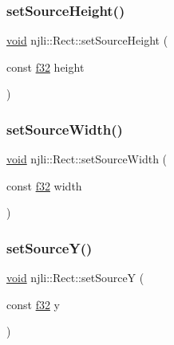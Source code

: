 \mbox{\label{classnjli_1_1_rect_ac47ba4c289d8439dafd653e3c403131a}} 
\subsubsection{\texorpdfstring{set\+Source\+Height()}{setSourceHeight()}}
{\footnotesize\ttfamily \mbox{\hyperlink{_thread_8h_af1e856da2e658414cb2456cb6f7ebc66}{void}} njli\+::\+Rect\+::set\+Source\+Height (\begin{DoxyParamCaption}\item[{const \mbox{\hyperlink{_util_8h_a5f6906312a689f27d70e9d086649d3fd}{f32}}}]{height }\end{DoxyParamCaption})}

\mbox{\label{classnjli_1_1_rect_aa3fd64395ce6b785b3ba5b38d11e1ee8}} 
\subsubsection{\texorpdfstring{set\+Source\+Width()}{setSourceWidth()}}
{\footnotesize\ttfamily \mbox{\hyperlink{_thread_8h_af1e856da2e658414cb2456cb6f7ebc66}{void}} njli\+::\+Rect\+::set\+Source\+Width (\begin{DoxyParamCaption}\item[{const \mbox{\hyperlink{_util_8h_a5f6906312a689f27d70e9d086649d3fd}{f32}}}]{width }\end{DoxyParamCaption})}

\mbox{\label{classnjli_1_1_rect_aad437bb2add0ea5cb17f32a51877e70e}} 
\subsubsection{\texorpdfstring{set\+Source\+Y()}{setSourceY()}}
{\footnotesize\ttfamily \mbox{\hyperlink{_thread_8h_af1e856da2e658414cb2456cb6f7ebc66}{void}} njli\+::\+Rect\+::set\+SourceY (\begin{DoxyParamCaption}\item[{const \mbox{\hyperlink{_util_8h_a5f6906312a689f27d70e9d086649d3fd}{f32}}}]{y }\end{DoxyParamCaption})}

